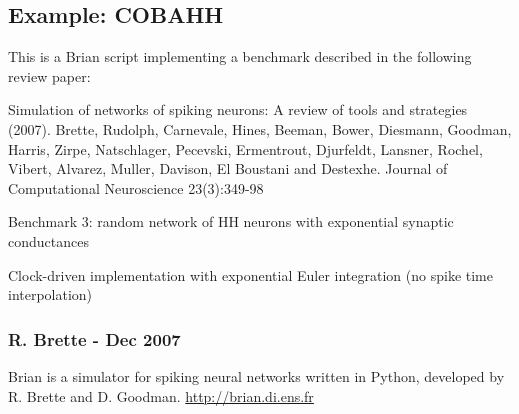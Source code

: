 \documentclass[letterpaper,10pt]{manual}
\begin{document}
\resetcurrentobjects
{}

\hypertarget{index-20}{}\subsection{Example: COBAHH}

This is a Brian script implementing a benchmark described
in the following review paper:

Simulation of networks of spiking neurons: A review of tools and strategies (2007).
Brette, Rudolph, Carnevale, Hines, Beeman, Bower, Diesmann, Goodman, Harris, Zirpe,
Natschlager, Pecevski, Ermentrout, Djurfeldt, Lansner, Rochel, Vibert, Alvarez, Muller,
Davison, El Boustani and Destexhe.
Journal of Computational Neuroscience 23(3):349-98

Benchmark 3: random network of HH neurons with exponential synaptic conductances

Clock-driven implementation with exponential Euler integration
(no spike time interpolation)


\subsubsection{R. Brette - Dec 2007}

Brian is a simulator for spiking neural networks written in Python, developed by
R. Brette and D. Goodman.
\href{http://brian.di.ens.fr}{http://brian.di.ens.fr}
\end{document}
